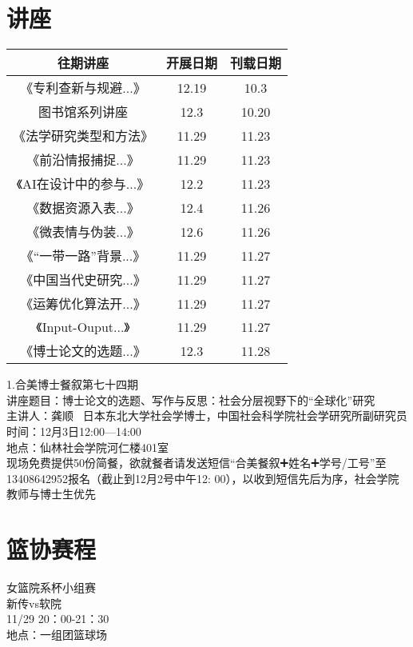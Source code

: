 \documentclass[letterpaper, 12pt]{article}
\begin{document}
\begin{multicols}{2}

\section{讲座}
\begin{tabular}{|c|c|c|}
    \hline
    往期讲座 & 开展日期 & 刊载日期\\
    \hline\hline
    《专利查新与规避...》 & 12.19 & 10.3\\
    图书馆系列讲座 & 12.3 & 10.20\\
    《法学研究类型和方法》 & 11.29 & 11.23\\
    《前沿情报捕捉...》 & 11.29 & 11.23\\
    《AI在设计中的参与...》 & 12.2 & 11.23\\
    《数据资源入表...》 & 12.4 & 11.26\\
    《微表情与伪装...》 & 12.6 & 11.26\\
    《“一带一路”背景...》& 11.29 & 11.27\\
    《中国当代史研究...》& 11.29 & 11.27\\
    《运筹优化算法开...》 & 11.29 & 11.27\\
    《Input-Ouput...》 & 11.29 & 11.27\\
    《博士论文的选题...》 & 12.3 & 11.28\\
    \hline
\end{tabular}

1.合美博士餐叙第七十四期\\
讲座题目：博士论文的选题、写作与反思：社会分层视野下的“全球化”研究\\主讲人：龚顺  日本东北大学社会学博士，中国社会科学院社会学研究所副研究员\\时间：12月3日12:00—14:00 \\地点：仙林社会学院河仁楼401室\\现场免费提供50份简餐，欲就餐者请发送短信“合美餐叙➕姓名➕学号/工号”至13408642952报名（截止到12月2号中午12: 00），以收到短信先后为序，社会学院教师与博士生优先\\


\section{篮协赛程}
女篮院系杯小组赛\\
新传vs软院 \\
11/29 20：00-21：30\\
地点：一组团篮球场\\


\end{multicols}
\end{document}
